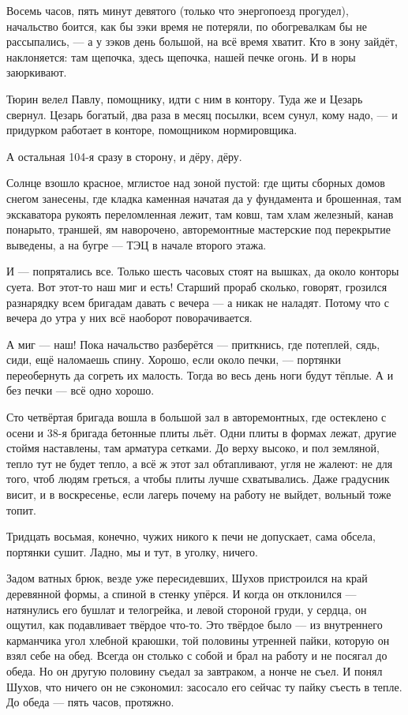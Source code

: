 Восемь часов, пять минут девятого (только что энергопоезд прогудел), начальство боится, как
бы зэки время не потеряли, по обогревалкам бы не рассыпались, --- а у зэков день большой, на всё
время хватит. Кто в зону зайдёт, наклоняется: там щепочка, здесь щепочка, нашей печке огонь. И
в норы заюркивают.

Тюрин велел Павлу, помощнику, идти с ним в контору. Туда же и Цезарь свернул. Цезарь богатый,
два раза в месяц посылки, всем сунул, кому надо, --- и придурком работает в конторе, помощником
нормировщика.

А остальная 104-я сразу в сторону, и дёру, дёру.

Солнце взошло красное, мглистое над зоной пустой: где щиты сборных домов снегом занесены,
где кладка каменная начатая да у фундамента и брошенная, там экскаватора рукоять
переломленная лежит, там ковш, там хлам железный, канав понарыто, траншей, ям наворочено,
авторемонтные мастерские под перекрытие выведены, а на бугре --- ТЭЦ в начале второго этажа.

И --- попрятались все. Только шесть часовых стоят на вышках, да около конторы суета. Вот
этот-то наш миг и есть! Старший прораб сколько, говорят, грозился разнарядку всем бригадам
давать с вечера --- а никак не наладят. Потому что с вечера до утра у них всё наоборот
поворачивается.

А миг --- наш! Пока начальство разберётся --- приткнись, где потеплей, сядь, сиди, ещё наломаешь
спину. Хорошо, если около печки, --- портянки переобернуть да согреть их малость. Тогда во весь
день ноги будут тёплые. А и без печки --- всё одно хорошо.

Сто четвёртая бригада вошла в большой зал в авторемонтных, где остеклено с осени и 38-я
бригада бетонные плиты льёт. Одни плиты в формах лежат, другие стоймя наставлены, там
арматура сетками. До верху высоко, и пол земляной, тепло тут не будет тепло, а всё ж этот зал
обтапливают, угля не жалеют: не для того, чтоб людям греться, а чтобы плиты лучше
схватывались. Даже градусник висит, и в воскресенье, если лагерь почему на работу не выйдет,
вольный тоже топит.

Тридцать восьмая, конечно, чужих никого к печи не допускает, сама обсела, портянки сушит.
Ладно, мы и тут, в уголку, ничего.

Задом ватных брюк, везде уже пересидевших, Шухов пристроился на край деревянной формы, а
спиной в стенку упёрся. И когда он отклонился --- натянулись его бушлат и телогрейка, и левой
стороной груди, у сердца, он ощутил, как подавливает твёрдое что-то. Это твёрдое было --- из
внутреннего карманчика угол хлебной краюшки, той половины утренней пайки, которую он взял
себе на обед. Всегда он столько с собой и брал на работу и не посягал до обеда. Но он другую
половину съедал за завтраком, а нонче не съел. И понял Шухов, что ничего он не сэкономил:
засосало его сейчас ту пайку съесть в тепле. До обеда --- пять часов, протяжно.

